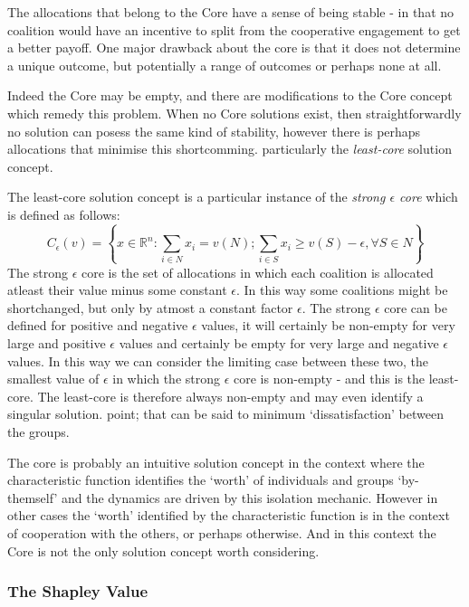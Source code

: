 The allocations that belong to the Core have a sense of being stable - in that no coalition would have an incentive to split from the cooperative engagement to get a better payoff. One major drawback about the core is that it does not determine a unique outcome, but potentially a range of outcomes or perhaps none at all.

Indeed the Core may be empty, and there are modifications to the Core concept which remedy this problem.
When no Core solutions exist, then straightforwardly no solution can posess the same kind of stability, however there is perhaps allocations that minimise this shortcomming.
particularly the \textit{least-core} solution concept.

The least-core solution concept is a particular instance of the \textit{strong $\epsilon$ core} which is defined as follows:
$$ C_\epsilon(v) = \left\{x\in\mathbb{R}^n : \sum_{i\in N}x_i=v(N); \sum_{i\in S}x_i \ge v(S)-\epsilon, \forall S\in N \right\}$$
The strong $\epsilon$ core is the set of allocations in which each coalition is allocated atleast their value minus some constant $\epsilon$.
In this way some coalitions might be shortchanged, but only by atmost a constant factor $\epsilon$.
The strong $\epsilon$ core can be defined for positive and negative $\epsilon$ values, it will certainly be non-empty for very large and positive $\epsilon$ values and certainly be empty for very large and negative $\epsilon$ values.
In this way we can consider the limiting case between these two, the smallest value of $\epsilon$ in which the strong $\epsilon$ core is non-empty - and this is the least-core.\cite{doi:10.1287/moor.4.4.303}
The least-core is therefore always non-empty and may even identify a singular solution. point; that can be said to minimum `dissatisfaction' between the groups.

The core is probably an intuitive solution concept in the context where the characteristic function identifies the `worth' of individuals and groups `by-themself' and the dynamics are driven by this isolation mechanic.
However in other cases the `worth' identified by the characteristic function is in the context of cooperation with the others, or perhaps otherwise.
And in this context the Core is not the only solution concept worth considering.

\subsubsection{The Shapley Value}

